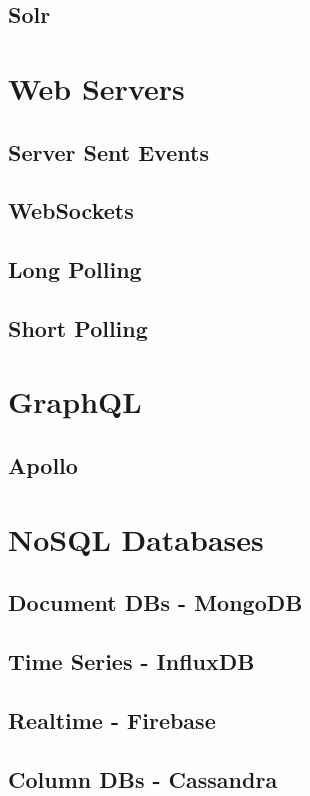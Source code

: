 \documentclass[a4paper]{article}
\begin{document}
    \subsection{Solr}


    \newpage
    \section{Web Servers}
    \subsection{Server Sent Events}
    \subsection{WebSockets}
    \subsection{Long Polling}
    \subsection{Short Polling}

    \newpage
    \section{GraphQL}
    \subsection{Apollo}

    \newpage
    \section{NoSQL Databases}
    \subsection{Document DBs - MongoDB}
    \subsection{Time Series - InfluxDB}
    \subsection{Realtime - Firebase}
    \subsection{Column DBs - Cassandra}
\end{document}
